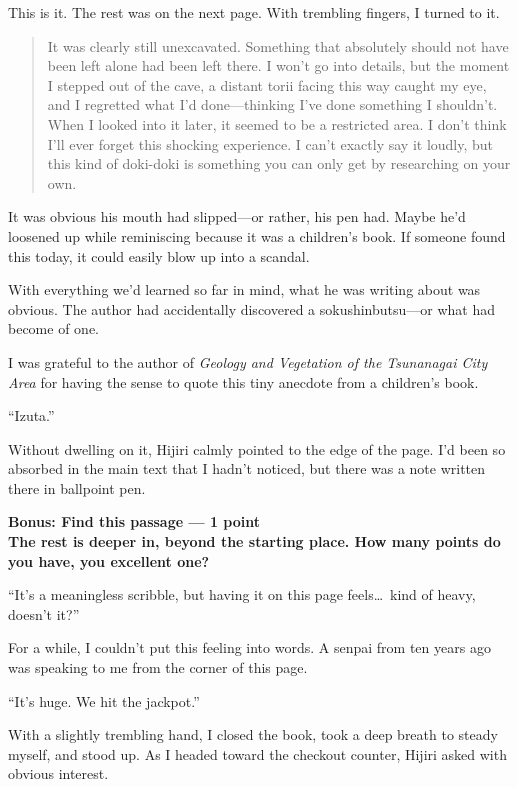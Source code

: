 \documentclass[
    a4paper,
    12pt,
    twoside,
    openany,
    UTF8,
    fontset=windows
]{ctexbook}
\begin{document}
This is it. The rest was on the next page. With trembling fingers, I turned to it.

{\bfseries
\begin{quote}
It was clearly still unexcavated. Something that absolutely should not have been left alone had been left there. I won't go into details, but the moment I stepped out of the cave, a distant torii facing this way caught my eye, and I regretted what I'd done---thinking I've done something I shouldn't. When I looked into it later, it seemed to be a restricted area. I don't think I'll ever forget this shocking experience. I can't exactly say it loudly, but this kind of doki-doki is something you can only get by researching on your own.
\end{quote}
}

It was obvious his mouth had slipped---or rather, his pen had. Maybe he'd loosened up while reminiscing because it was a children's book. If someone found this today, it could easily blow up into a scandal.

With everything we'd learned so far in mind, what he was writing about was obvious.
The author had accidentally discovered a sokushinbutsu---or what had become of one.

I was grateful to the author of \textit{Geology and Vegetation of the Tsunanagai City Area} for having the sense to quote this tiny anecdote from a children's book.

``Izuta.''

Without dwelling on it, Hijiri calmly pointed to the edge of the page. I'd been so absorbed in the main text that I hadn't noticed, but there was a note written there in ballpoint pen.


\textbf{Bonus: Find this passage --- 1 point}\\
\textbf{The rest is deeper in, beyond the starting place. How many points do you have, you excellent one?}


``It's a meaningless scribble, but having it on this page feels\dots\ kind of heavy, doesn't it?''

For a while, I couldn't put this feeling into words.
A senpai from ten years ago was speaking to me from the corner of this page.

``It's huge. We hit the jackpot.''

With a slightly trembling hand, I closed the book, took a deep breath to steady myself, and stood up. As I headed toward the checkout counter, Hijiri asked with obvious interest.
\end{document}
